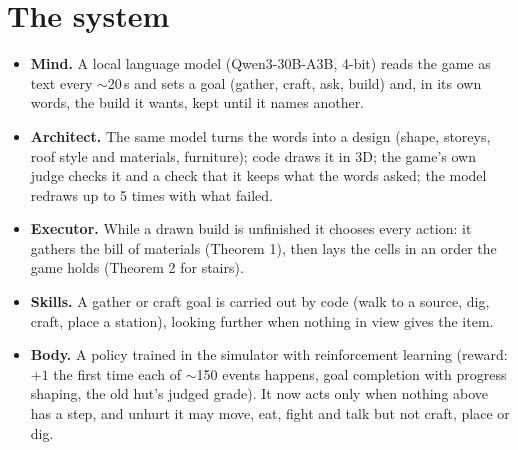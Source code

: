 \section*{The system}
\begin{itemize}
\item \textbf{Mind.} A local language model (Qwen3-30B-A3B, 4-bit) reads the game as text every $\sim$20\,s and sets a
goal (gather, craft, ask, build) and, in its own words, the build it wants, kept until it names another.
\item \textbf{Architect.} The same model turns the words into a design (shape, storeys, roof style and materials,
furniture); code draws it in 3D; the game's own judge checks it and a check that it keeps what the words asked; the
model redraws up to 5 times with what failed.
\item \textbf{Executor.} While a drawn build is unfinished it chooses every action: it gathers the bill of materials
(Theorem 1), then lays the cells in an order the game holds (Theorem 2 for stairs).
\item \textbf{Skills.} A gather or craft goal is carried out by code (walk to a source, dig, craft, place a station),
looking further when nothing in view gives the item.
\item \textbf{Body.} A policy trained in the simulator with reinforcement learning (reward: $+1$ the first time each of
$\sim$150 events happens, goal completion with progress shaping, the old hut's judged grade). It now acts only when
nothing above has a step, and unhurt it may move, eat, fight and talk but not craft, place or dig.
\end{itemize}
